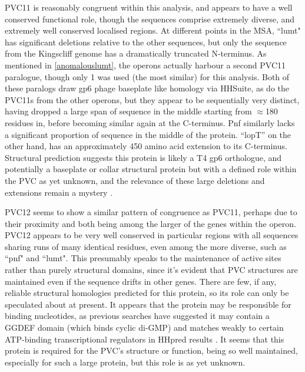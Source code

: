 PVC11 is reasonably congruent within this analysis, and appears to have a well conserved functional role, though the sequences comprise extremely diverse, and extremely well conserved localised regions. At different points in the MSA, ``lumt" has significant deletions relative to the other sequences, but only the sequence from the Kingscliff genome has a dramatically truncated N-terminus. As mentioned in \vref{anomalouslumt}, the operons actually harbour a second PVC11 paralogue, though only 1 was used (the most similar) for this analysis. Both of these paralogs draw gp6 phage baseplate like homology via HHSuite, as do the PVC11s from the other operons, but they appear to be sequentially very distinct, having dropped a large span of sequence in the middle starting from $\approx$180 residues in, before becoming similar again at the C-terminus. Pnf similarly lacks a significant proportion of sequence in the middle of the protein. ``lopT'' on the other hand, has an approximately 450 amino acid extension to its C-terminus. Structural prediction suggests this protein is likely a T4 gp6 orthologue, and potentially a baseplate or collar structural protein but with a defined role within the PVC as yet unknown, and the relevance of these large deletions and extensions remain a mystery \citep{Cardarelli2010, Aksyuk2009a}.

PVC12 seems to show a similar pattern of congruence as PVC11, perhaps due to their proximity and both being among the larger of the genes within the operon. PVC12 appears to be very well conserved in particular regions with all sequences sharing runs of many identical residues, even among the more diverse, such as ``pnf" and ``lumt". This presumably speaks to the maintenance of active sites rather than purely structural domains, since it's evident that PVC structures are maintained even if the sequence drifts in other genes. There are few, if any, reliable structural homologies predicted for this protein, so its role can only be speculated about at present. It appears that the protein may be responsible for binding nucleotides, as previous searches have suggested it may contain a GGDEF domain (which binds cyclic di-GMP) and matches weakly to certain ATP-binding transcriptional regulators in HHpred results \citep{Paul2004}. It seems that this protein is required for the PVC's structure or function, being so well maintained, especially for such a large protein, but this role is as yet unknown.

